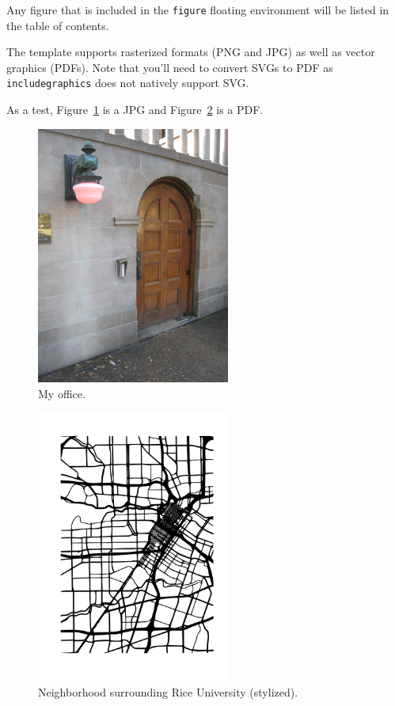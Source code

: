 \documentclass[12pt]{ruthesis}
\begin{document}
Any figure that is included in the \verb_figure_ floating environment will be listed in the table of contents.

The template supports rasterized formats (PNG and JPG) as well as vector graphics (PDFs). Note that you'll need to convert SVGs to PDF as \verb_includegraphics_ does not natively support SVG.

As a test, Figure~\ref{fig:valhalla} is a JPG and Figure~\ref{fig:westU} is a PDF.

\begin{figure}[b]
\centering
\vspace{-0.4cm}
\includegraphics[width=2.5in]{valhalla.jpg}
\caption{My office.}
\label{fig:valhalla}
\end{figure}


\begin{figure}[b]
\centering
\vspace{-0.4cm}
\includegraphics[width=2.5in]{westU.pdf}
\caption{Neighborhood surrounding Rice University (stylized).}
\label{fig:westU}
\end{figure}
\end{document}
